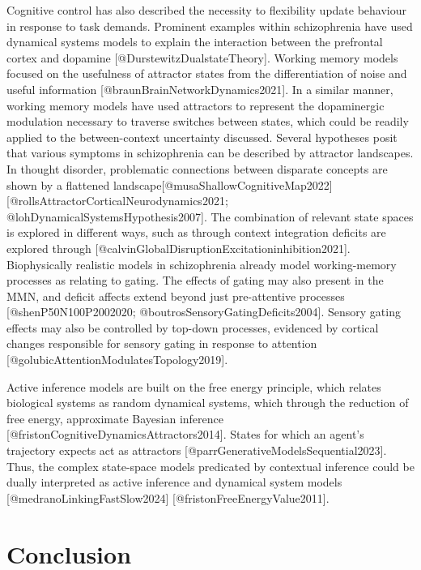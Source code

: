 \documentclass{article}
\begin{document}
Cognitive control has also described the necessity to flexibility update behaviour in response to task demands. Prominent examples within schizophrenia have used dynamical systems models to explain the interaction between the prefrontal cortex and dopamine [@DurstewitzDualstateTheory]. Working memory models focused on the usefulness of attractor states from the differentiation of noise and useful information [@braunBrainNetworkDynamics2021]. In a similar manner, working memory models have used attractors to represent the dopaminergic modulation necessary to traverse switches between states, which could be readily applied to the between-context uncertainty discussed.
Several hypotheses posit that various symptoms in schizophrenia can be described by attractor landscapes. In thought disorder, problematic connections between disparate concepts are shown by a flattened landscape[@musaShallowCognitiveMap2022] [@rollsAttractorCorticalNeurodynamics2021; @lohDynamicalSystemsHypothesis2007]. The combination of relevant state spaces is explored in different ways, such as through context integration deficits are explored through [@calvinGlobalDisruptionExcitationinhibition2021]. Biophysically realistic models in schizophrenia already model working-memory processes as relating to gating. The effects of gating may also present in the MMN, and deficit affects extend beyond just pre-attentive processes [@shenP50N100P2002020; @boutrosSensoryGatingDeficits2004]. Sensory gating effects may also be controlled by top-down processes, evidenced by cortical changes responsible for sensory gating in response to attention [@golubicAttentionModulatesTopology2019].

Active inference models are built on the free energy principle, which relates biological systems as random dynamical systems, which through the reduction of free energy, approximate Bayesian inference [@fristonCognitiveDynamicsAttractors2014]. States for which an agent's trajectory expects act as attractors [@parrGenerativeModelsSequential2023]. Thus, the complex state-space models predicated by contextual inference could be dually interpreted as active inference and dynamical system models [@medranoLinkingFastSlow2024]
[@fristonFreeEnergyValue2011].

\section{Conclusion}\label{conclusion}
\end{document}

